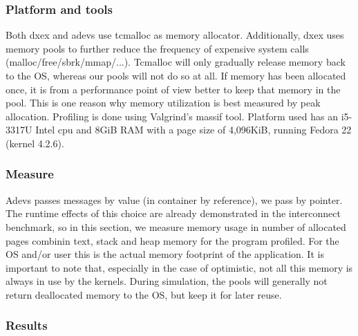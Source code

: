\subsubsection{Platform and tools}
Both dxex and adevs use tcmalloc as memory allocator. Additionally, dxex uses memory pools to further reduce the frequency of expensive system calls (malloc/free/sbrk/mmap/...). Tcmalloc will only gradually release memory back to the OS, whereas our pools will not do so at all. If memory has been allocated once, it is from a performance point of view better to keep that memory in the pool. This is one reason why memory utilization is best measured by peak allocation. Profiling is done using Valgrind's massif tool. \cite{Nethercote:2007:VFH:1273442.1250746}
Platform used has an i5-3317U Intel cpu and 8GiB RAM with a page size of 4,096KiB, running Fedora 22 (kernel 4.2.6).\\
\subsubsection{Measure}
Adevs passes messages by value (in container by reference), we pass by pointer. The runtime effects of this choice are already demonstrated in the interconnect benchmark, so in this section, we measure memory usage in number of allocated pages combinin text, stack and heap memory for the program profiled. For the OS and/or user this is the actual memory footprint of the application. It is important to note that, especially in the case of optimistic, not all this memory is always in use by the kernels. During simulation, the pools will generally not return deallocated memory to the OS, but keep it for later reuse.
\subsubsection{Results}
